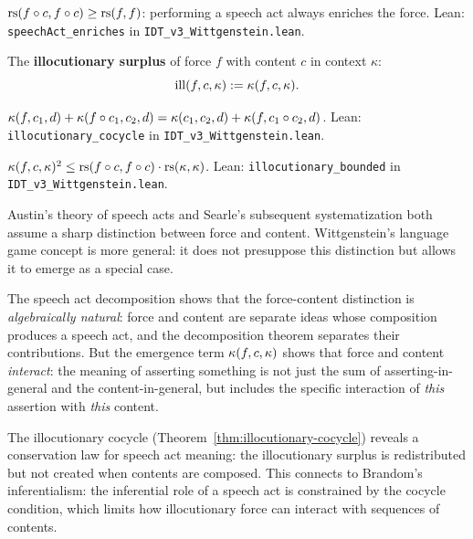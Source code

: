 \begin{theorem}
\label{thm:speech-act-enriches}
$\mathrm{rs}(f \circ c, f \circ c) \geq \mathrm{rs}(f, f)$: performing a speech act
always enriches the force.
Lean: \texttt{speechAct\_enriches} in \texttt{IDT\_v3\_Wittgenstein.lean}.
\end{theorem}

\begin{definition}
The \textbf{illocutionary surplus} of force $f$ with content $c$ in
context $\kappa$:
\[
\mathrm{ill}(f, c, \kappa) := \kappa(f, c, \kappa).
\]
\end{definition}

\begin{theorem}
\label{thm:illocutionary-cocycle}
$\kappa(f, c_1, d) + \kappa(f \circ c_1, c_2, d)
= \kappa(c_1, c_2, d) + \kappa(f, c_1 \circ c_2, d)$.
Lean: \texttt{illocutionary\_cocycle} in \texttt{IDT\_v3\_Wittgenstein.lean}.
\end{theorem}

\begin{theorem}
\label{thm:illocutionary-bounded}
$\kappa(f, c, \kappa)^2 \leq \mathrm{rs}(f \circ c, f \circ c)
\cdot \mathrm{rs}(\kappa, \kappa)$.
Lean: \texttt{illocutionary\_bounded} in
\texttt{IDT\_v3\_Wittgenstein.lean}.
\end{theorem}

\begin{interpretation}
Austin's theory of speech acts and Searle's subsequent systematization both
assume a sharp distinction between force and content. Wittgenstein's language
game concept is more general: it does not presuppose this distinction but allows
it to emerge as a special case.

The speech act decomposition shows that the force-content distinction is
\emph{algebraically natural}: force and content are separate ideas whose
composition produces a speech act, and the decomposition theorem separates their
contributions. But the emergence term $\kappa(f, c, \kappa)$ shows that
force and content \emph{interact}: the meaning of asserting something is not
just the sum of asserting-in-general and the content-in-general, but includes
the specific interaction of \emph{this} assertion with \emph{this} content.

The illocutionary cocycle (Theorem~\ref{thm:illocutionary-cocycle}) reveals a
conservation law for speech act meaning: the illocutionary surplus is
redistributed but not created when contents are composed. This connects to
Brandom's inferentialism: the inferential role of a speech act is constrained
by the cocycle condition, which limits how illocutionary force can interact with
sequences of contents.
\end{interpretation}

